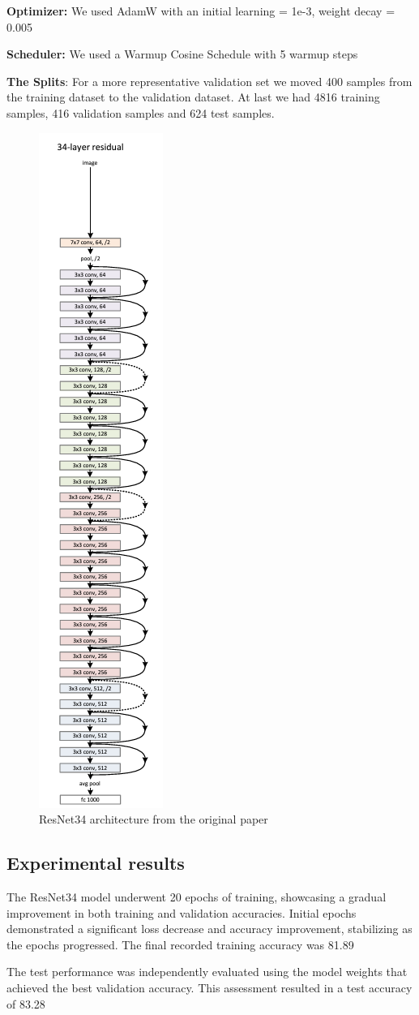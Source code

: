 \documentclass{article}
\begin{document}
\textbf{Optimizer:} We used AdamW with an initial learning = 1e-3, weight decay = 0.005

\textbf{Scheduler:} We used a Warmup Cosine Schedule with 5 warmup steps

\textbf{The Splits}: For a more representative validation set we moved 400 samples from the training dataset to the validation dataset. At last we had 4816 training samples, 416 validation samples and 624 test samples.

\begin{figure}
  \centering
  \includegraphics[width=0.15\linewidth, angle=90]{resnet.png}
  \caption{ResNet34 architecture from the original paper}
  \label{fig:resnet}
\end{figure}

\subsection{Experimental results}
The ResNet34 model underwent 20 epochs of training, showcasing a gradual improvement in both training and validation accuracies. Initial epochs demonstrated a significant loss decrease and accuracy improvement, stabilizing as the epochs progressed. The final recorded training accuracy was 81.89%

The test performance was independently evaluated using the model weights that achieved the best validation accuracy. This assessment resulted in a test accuracy of 83.28%
\end{document}
